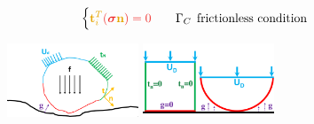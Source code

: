 \documentclass[8pt, oneside]{beamer}   	%
\newcommand{\bn}{\textbf{n}}
\newcommand{\bt}{\textbf{t}}
\newcommand{\bsigma}{\boldsymbol{\sigma}}
\newcommand{\colo}{\color{orange}}
\newcommand{\colk}{\color{black}}
\newcommand{\colgold}{\color{gold}}
\begin{document}
\begin{frame}
\begin{itemize}
{\begin{align*}
\begin{cases}
\colgold \bt_i^T \colo(\bsigma \colgold \bn \colo) =0  \quad & \Gamma_C  \:\: \colk{\text{frictionless condition}}
\end{cases}
\end{align*}
\begin{figure}[htbp!]
		\centering
	\includegraphics[width=0.35\textwidth]{img/contactproblem.pdf}\qquad
	\includegraphics[width=0.35\textwidth]{img/squarecircle.pdf}
		\label{abb_arc}
\end{figure}
}
\end{itemize}
\end{frame}


\end{document}
